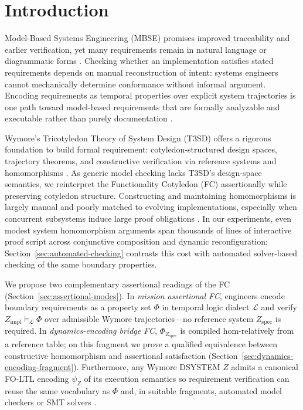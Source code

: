 \section{Introduction}

Model-Based Systems Engineering (MBSE) promises improved traceability and earlier verification, yet many requirements remain in natural language or diagrammatic forms \parencite{salado2019mbse}. Checking whether an implementation satisfies stated requirements depends on manual reconstruction of intent: systems engineers cannot mechanically determine conformance without informal argument. Encoding requirements as temporal properties over explicit system trajectories is one path toward model-based requirements that are formally analyzable and executable rather than purely documentation \parencite{salado2019mbse}.

Wymore's Tricotyledon Theory of System Design (T3SD) offers a rigorous foundation to build formal requirement: cotyledon-structured design spaces, trajectory theorems, and constructive verification via reference systems and homomorphisms \parencite{Wymore1993,salado2019wymore}. As generic model checking lacks T3SD's design-space semantics, we reinterpret the Functionality Cotyledon (FC) assertionally while preserving cotyledon structure. Constructing and maintaining homomorphisms is largely manual and poorly matched to evolving implementations, especially when concurrent subsystems induce large proof obligations \parencite{Wymore1993}. In our experiments, even modest system homomorphism arguments span thousands of lines of interactive proof script across conjunctive composition and dynamic reconfiguration; Section~\ref{sec:automated-checking} contrasts this cost with automated solver-based checking of the same boundary properties.

We propose two complementary assertional readings of the FC (Section~\ref{sec:assertional-modes}). In \emph{mission assertional FC}, engineers encode boundary requirements as a property set $\Phi$ in temporal logic dialect $\mathcal{L}$ and verify $Z_{\text{impl}} \models_{\mathcal{L}} \Phi$ over admissible Wymore trajectories---no reference system $Z_{\text{spec}}$ is required. In \emph{dynamics-encoding bridge FC}, $\Phi_{Z_{\text{spec}}}$ is compiled hom-relatively from a reference table; on this fragment we prove a qualified equivalence between constructive homomorphism and assertional satisfaction (Section~\ref{sec:dynamics-encoding-fragment}). Furthermore, any Wymore DSYSTEM $Z$ admits a canonical FO-LTL encoding $\psi_Z$ of its execution semantics so requirement verification can reuse the same vocabulary as $\Phi$ and, in suitable fragments, automated model checkers or SMT solvers \parencite{BaierKatoen2008,deMouraZ32008}.

